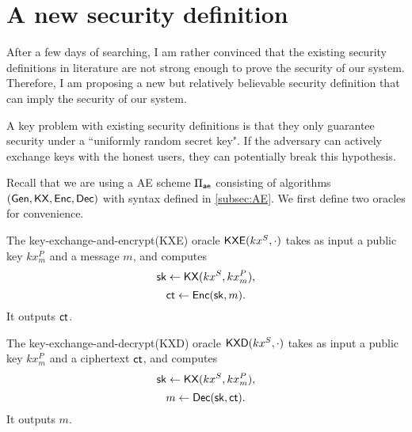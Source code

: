 \section{A new security definition}
\label{sec:IND-CCPKA}
After a few days of searching, I am rather convinced that the existing security definitions in literature are not strong enough to prove the security of our system. Therefore, I am proposing a new but relatively believable security definition that can imply the security of our system.

A key problem with existing security definitions is that they only guarantee security under a ``uniformly random secret key". If the adversary can actively exchange keys with the honest users, they can potentially break this hypothesis.

Recall that we are using a AE scheme $\Pi_{\mathsf{ae}}$ consisting of algorithms $(\mathsf{Gen}, \mathsf{KX}, \mathsf{Enc}, \mathsf{Dec})$ with syntax defined in \cref{subsec:AE}. We first define two oracles for convenience.

\begin{definition}
The key-exchange-and-encrypt(KXE) oracle $\mathsf{KXE}(kx^S, \cdot)$ takes as input a public key $kx_m^P$ and a message $m$, and computes
$${\mathsf{sk}} \leftarrow \mathsf{KX}(kx^S, kx_m^P),$$
$$\mathsf{ct} \leftarrow \mathsf{Enc}({\mathsf{sk}}, m).$$
It outputs $\mathsf{ct}$.

The key-exchange-and-decrypt(KXD) oracle $\mathsf{KXD}(kx^S, \cdot)$ takes as input a public key $kx_m^P$ and a ciphertext $\mathsf{ct}$, and computes
$${\mathsf{sk}} \leftarrow \mathsf{KX}(kx^S, kx_m^P),$$
$$m \leftarrow \mathsf{Dec}({\mathsf{sk}}, \mathsf{ct}).$$
It outputs $m$.
\end{definition}

